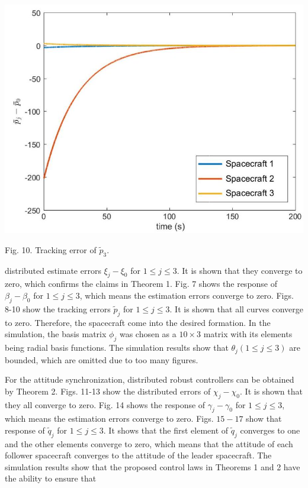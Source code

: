 \documentclass[10pt]{article}
\begin{document}
\begin{center}
\includegraphics[max width=\textwidth]{2023_10_07_a50fd94fd281fe9896c1g-08(2)}
\end{center}

Fig. 10. Tracking error of $\tilde{p}_{3}$.

distributed estimate errors $\xi_{j}-\xi_{0}$ for $1 \leq j \leq 3$. It is shown that they converge to zero, which confirms the claims in Theorem 1. Fig. 7 shows the response of $\beta_{j}-\beta_{0}$ for $1 \leq j \leq 3$, which means the estimation errors converge to zero. Figs. 8-10 show the tracking errors $\tilde{p}_{j}$ for $1 \leq j \leq 3$. It is shown that all curves converge to zero. Therefore, the spacecraft come into the desired formation. In the simulation, the basis matrix $\phi_{j}$ was chosen as a $10 \times 3$ matrix with its elements being radial basis functions. The simulation results show that $\theta_{j}(1 \leq j \leq 3)$ are bounded, which are omitted due to too many figures.

For the attitude synchronization, distributed robust controllers can be obtained by Theorem 2. Figs. 11-13 show the distributed errors of $\chi_{j}-\chi_{0}$. It is shown that they all converge to zero. Fig. 14 shows the response of $\gamma_{j}-\gamma_{0}$ for $1 \leq j \leq 3$, which means the estimation errors converge to zero. Figs. $15-17$ show that response of $\tilde{q}_{j}$ for $1 \leq j \leq 3$. It shows that the first element of $\tilde{q}_{j}$ converges to one and the other elements converge to zero, which means that the attitude of each follower spacecraft converges to the attitude of the leader spacecraft. The simulation results show that the proposed control laws in Theorems 1 and 2 have the ability to ensure that
\end{document}
